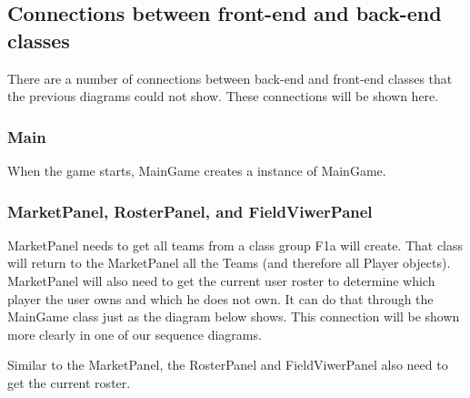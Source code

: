 \documentclass{article}
\begin{document}
\newpage
\subsection{Connections between front-end and back-end classes}
There are a number of connections between back-end and front-end classes that the previous diagrams could not show. These connections will be shown here.
\subsubsection{Main}
When the game starts, MainGame creates a instance of MainGame.


\subsubsection{MarketPanel, RosterPanel, and FieldViwerPanel}
MarketPanel needs to get all teams from a class group F1a will create. That class will return to the MarketPanel all the Teams (and therefore all Player objects). MarketPanel will also need to get the current user roster to determine which player the user owns and which he does not own. It can do that through the MainGame class just as the diagram below shows. This connection will be shown more clearly in one of our sequence diagrams.

Similar to the MarketPanel, the RosterPanel and FieldViwerPanel also need to get the current roster.
\end{document}
